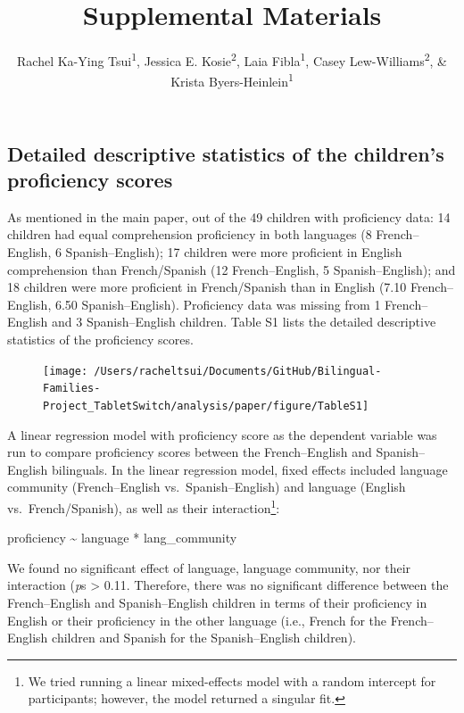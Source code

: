 \documentclass[
  man,floatsintext]{apa7}
\title{Supplemental Materials}
\author{Rachel Ka-Ying Tsui\textsuperscript{1}, Jessica E. Kosie\textsuperscript{2}, Laia Fibla\textsuperscript{1}, Casey Lew-Williams\textsuperscript{2}, \& Krista Byers-Heinlein\textsuperscript{1}}
\date{}
\affiliation{\vspace{0.5cm}\textsuperscript{1} Concordia University\\\textsuperscript{2} Princeton University}
\begin{document}
\maketitle

\captionsetup[table]{labelformat=empty}

\hypertarget{detailed-descriptive-statistics-of-the-childrens-proficiency-scores}{%
\subsection{Detailed descriptive statistics of the children's proficiency scores}\label{detailed-descriptive-statistics-of-the-childrens-proficiency-scores}}

As mentioned in the main paper, out of the 49 children with proficiency data: 14 children had equal comprehension proficiency in both languages (8 French--English, 6 Spanish--English); 17 children were more proficient in English comprehension than French/Spanish (12 French--English, 5 Spanish--English); and 18 children were more proficient in French/Spanish than in English (7.10 French--English, 6.50 Spanish--English). Proficiency data was missing from 1 French--English and 3 Spanish--English children. Table S1 lists the detailed descriptive statistics of the proficiency scores.

\begin{figure}[H]

{\centering \texttt{[image: /Users/racheltsui/Documents/GitHub/Bilingual-Families-Project\_TabletSwitch/analysis/paper/figure/TableS1]} 

}

\end{figure}

A linear regression model with proficiency score as the dependent variable was run to compare proficiency scores between the French--English and Spanish--English bilinguals. In the linear regression model, fixed effects included language community (French--English vs.~Spanish--English) and language (English vs.~French/Spanish), as well as their interaction\footnote{We tried running a linear mixed-effects model with a random intercept for participants; however, the model returned a singular fit.}:

proficiency \textasciitilde{} language * lang\_community

\noindent We found no significant effect of language, language community, nor their interaction (\emph{p}s \textgreater{} 0.11. Therefore, there was no significant difference between the French--English and Spanish--English children in terms of their proficiency in English or their proficiency in the other language (i.e., French for the French--English children and Spanish for the Spanish--English children).
\end{document}
